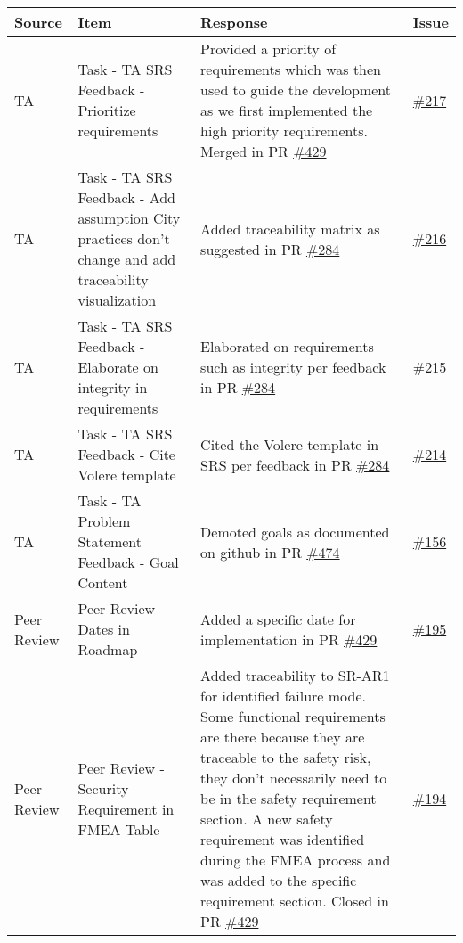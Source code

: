 \documentclass{article}
\begin{document}
\begin{longtable}{|m{3cm}|m{3cm}|m{5cm}|m{1cm}|}
  \hline
  \textbf{Source} & \textbf{Item} & \textbf{Response} & \textbf{Issue}\\
  \hline
  TA & Task - TA SRS Feedback - Prioritize requirements & Provided a priority of requirements which was then used to guide the
  development as we first implemented the high priority requirements. Merged in PR \href{https://github.com/Spitgranger/SyncMaster/pull/429}{\#429} & \href{https://github.com/Spitgranger/SyncMaster/pull/217}{\#217}\\
  \hline
  TA & Task - TA SRS Feedback - Add assumption City practices don't change and add traceability visualization &
  Added traceability matrix as suggested in PR \href{https://github.com/Spitgranger/SyncMaster/pull/284}{\#284} & \href{https://github.com/Spitgranger/SyncMaster/pull/216}{\#216}\\
  \hline
  TA & Task - TA SRS Feedback - Elaborate on integrity in requirements & Elaborated on requirements such as integrity per 
  feedback in PR \href{https://github.com/Spitgranger/SyncMaster/pull/284}{\#284} & \#215\\
  \hline
  TA & Task - TA SRS Feedback - Cite Volere template & Cited the Volere template in SRS per feedback in PR \href{https://github.com/Spitgranger/SyncMaster/pull/284}{\#284} & \href{https://github.com/Spitgranger/SyncMaster/pull/214}{\#214}\\
  \hline
  TA & Task - TA Problem Statement Feedback - Goal Content & Demoted goals as documented on github in PR \href{https://github.com/Spitgranger/SyncMaster/pull/474}{\#474}
   & \href{https://github.com/Spitgranger/SyncMaster/pull/156}{\#156}\\
  \hline
  Peer Review & Peer Review - Dates in Roadmap & Added a specific date for implementation in PR \href{https://github.com/Spitgranger/SyncMaster/pull/429}{\#429} 
  & \href{https://github.com/Spitgranger/SyncMaster/pull/195}{\#195} \\
 \hline
 Peer Review & Peer Review - Security Requirement in FMEA Table & Added traceability to SR-AR1 for identified failure mode.
 Some functional requirements are there because they are traceable to the safety risk, 
 they don't necessarily need to be in the safety requirement section.
  A new safety requirement was identified during the FMEA process and was added to the specific requirement section.
  Closed in PR \href{https://github.com/Spitgranger/SyncMaster/pull/429}{\#429} & \href{https://github.com/Spitgranger/SyncMaster/pull/194}{\#194}\\

\end{longtable}
\end{document}
